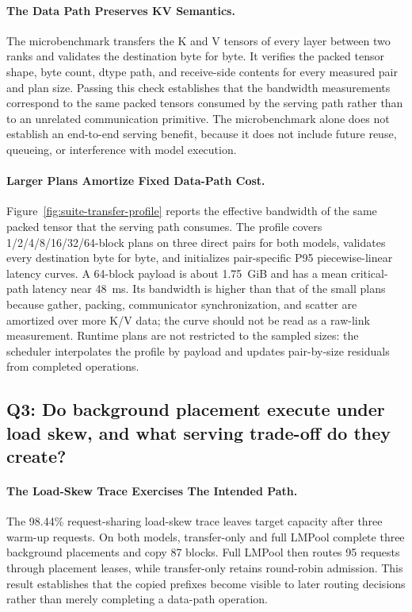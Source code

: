 \documentclass{article}
\newcommand{\sys}{LMPool}
\begin{document}
\paragraph{The Data Path Preserves KV Semantics.} The microbenchmark transfers the K and V tensors of every layer between two ranks and validates the destination byte for byte. It verifies the packed tensor shape, byte count, dtype path, and receive-side contents for every measured pair and plan size. Passing this check establishes that the bandwidth measurements correspond to the same packed tensors consumed by the serving path rather than to an unrelated communication primitive. The microbenchmark alone does not establish an end-to-end serving benefit, because it does not include future reuse, queueing, or interference with model execution.

\paragraph{Larger Plans Amortize Fixed Data-Path Cost.} Figure~\ref{fig:suite-transfer-profile} reports the effective bandwidth of the same packed tensor that the serving path consumes. The profile covers 1/2/4/8/16/32/64-block plans on three direct pairs for both models, validates every destination byte for byte, and initializes pair-specific P95 piecewise-linear latency curves. A 64-block payload is about 1.75~GiB and has a mean critical-path latency near 48~ms. Its bandwidth is higher than that of the small plans because gather, packing, communicator synchronization, and scatter are amortized over more K/V data; the curve should not be read as a raw-link measurement. Runtime plans are not restricted to the sampled sizes: the scheduler interpolates the profile by payload and updates pair-by-size residuals from completed operations.

\subsection{Q3: Do background placement execute under load skew, and what serving trade-off do they create?}

\paragraph{The Load-Skew Trace Exercises The Intended Path.} The 98.44\% request-sharing load-skew trace leaves target capacity after three warm-up requests. On both models, transfer-only and full \sys{} complete three background placements and copy 87 blocks. Full \sys{} then routes 95 requests through placement leases, while transfer-only retains round-robin admission. This result establishes that the copied prefixes become visible to later routing decisions rather than merely completing a data-path operation.
\end{document}
